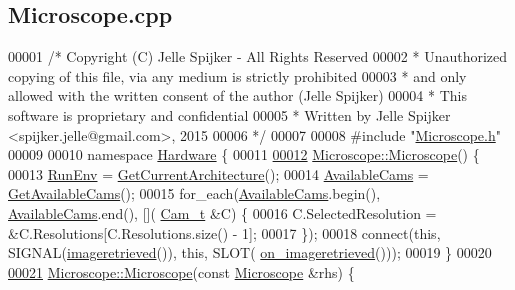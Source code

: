 \hypertarget{_microscope_8cpp_source}{}\subsection{Microscope.\+cpp}
\label{_microscope_8cpp_source}

\begin{DoxyCode}
00001 \textcolor{comment}{/* Copyright (C) Jelle Spijker - All Rights Reserved}
00002 \textcolor{comment}{ * Unauthorized copying of this file, via any medium is strictly prohibited}
00003 \textcolor{comment}{ * and only allowed with the written consent of the author (Jelle Spijker)}
00004 \textcolor{comment}{ * This software is proprietary and confidential}
00005 \textcolor{comment}{ * Written by Jelle Spijker <spijker.jelle@gmail.com>, 2015}
00006 \textcolor{comment}{ */}
00007 
00008 \textcolor{preprocessor}{#include "\hyperlink{_microscope_8h}{Microscope.h}"}
00009 
00010 \textcolor{keyword}{namespace }\hyperlink{namespace_hardware}{Hardware} \{
00011 
\hypertarget{_microscope_8cpp_source_l00012}{}\hyperlink{class_hardware_1_1_microscope_a447e1c2d17d75090120b22ad6323de2a}{00012} \hyperlink{class_hardware_1_1_microscope_a447e1c2d17d75090120b22ad6323de2a}{Microscope::Microscope}() \{
00013   \hyperlink{class_hardware_1_1_microscope_a544911a6d1eec986001087e5d9278604}{RunEnv} = \hyperlink{class_hardware_1_1_microscope_a24538a26545c6138b2e922ed4feb9376}{GetCurrentArchitecture}();
00014   \hyperlink{class_hardware_1_1_microscope_a49a52c74d900f217ed190d36b29ff27d}{AvailableCams} = \hyperlink{class_hardware_1_1_microscope_a71a409aae67baf63fd27678eda462e38}{GetAvailableCams}();
00015   for\_each(\hyperlink{class_hardware_1_1_microscope_a49a52c74d900f217ed190d36b29ff27d}{AvailableCams}.begin(), \hyperlink{class_hardware_1_1_microscope_a49a52c74d900f217ed190d36b29ff27d}{AvailableCams}.end(), [](
      \hyperlink{struct_hardware_1_1_microscope_1_1_cam__t}{Cam\_t} &C) \{
00016     C.SelectedResolution = &C.Resolutions[C.Resolutions.size() - 1];
00017   \});
00018   connect(\textcolor{keyword}{this}, SIGNAL(\hyperlink{class_hardware_1_1_microscope_a9ffc9b16e733b23c97d7dca4ef3210f5}{imageretrieved}()), \textcolor{keyword}{this}, SLOT(
      \hyperlink{class_hardware_1_1_microscope_a30346757ffd5d2f9d42b5a483842431e}{on\_imageretrieved}()));
00019 \}
00020 
\hypertarget{_microscope_8cpp_source_l00021}{}\hyperlink{class_hardware_1_1_microscope_a1f40641ce0c8dfc2611af33eeb985160}{00021} \hyperlink{class_hardware_1_1_microscope_a447e1c2d17d75090120b22ad6323de2a}{Microscope::Microscope}(\textcolor{keyword}{const} \hyperlink{class_hardware_1_1_microscope}{Microscope} &rhs) \{

\end{DoxyCode}
